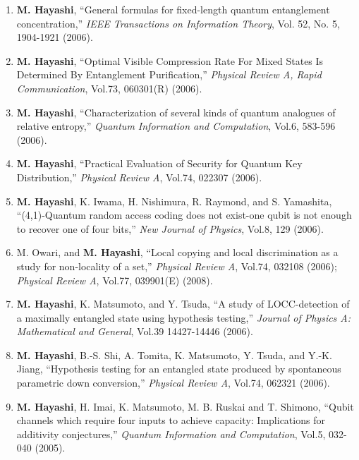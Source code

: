 \documentclass[a4paper,12pt,oneside]{article}
\begin{document}
\begin{enumerate}
\item
\textbf{M. Hayashi}, ``General formulas for fixed-length quantum entanglement concentration,'' 
{\em IEEE Transactions on Information Theory}, Vol. 52, No. 5, 1904-1921 (2006).

\item
\textbf{M. Hayashi}, ``Optimal Visible Compression Rate For Mixed States Is Determined By Entanglement Purification,'' 
{\em Physical Review A, Rapid Communication}, Vol.73, 060301(R) (2006). 

\item
\textbf{M. Hayashi}, ``Characterization of several kinds of quantum analogues of relative entropy,'' 
{\em Quantum Information and Computation}, Vol.6, 583-596 (2006).

\item
\textbf{M. Hayashi}, ``Practical Evaluation of Security for Quantum Key Distribution,'' 
{\em Physical Review A}, Vol.74, 022307 (2006).

\item
\textbf{M. Hayashi}, K. Iwama, H. Nishimura, R. Raymond, and S. Yamashita, 
``(4,1)-Quantum random access coding does not exist-one qubit is not enough to recover one of four bits,'' 
{\em New Journal of Physics}, Vol.8, 129 (2006).

\item
M. Owari, and \textbf{M. Hayashi}, 
``Local copying and local discrimination as a study for non-locality of a set,'' 
{\em Physical Review A}, Vol.74, 032108 (2006); 
{\em Physical Review A}, Vol.77, 039901(E) (2008).

\item
\textbf{M. Hayashi}, K. Matsumoto, and Y. Tsuda, 
``A study of LOCC-detection of a maximally entangled state using hypothesis testing,'' 
{\em Journal of Physics A: Mathematical and General}, Vol.39 14427-14446 (2006).

\item
\textbf{M. Hayashi}, B.-S. Shi, A. Tomita, K. Matsumoto, Y. Tsuda, and Y.-K. Jiang, 
``Hypothesis testing for an entangled state produced by spontaneous parametric down conversion,'' 
{\em Physical Review A}, Vol.74, 062321 (2006).

\item
\textbf{M. Hayashi}, H. Imai, K. Matsumoto, M. B. Ruskai and T. Shimono, 
``Qubit channels which require four inputs to achieve capacity: Implications for additivity conjectures,'' 
{\em Quantum Information and Computation}, Vol.5, 032-040 (2005).


\end{enumerate}
\end{document}
